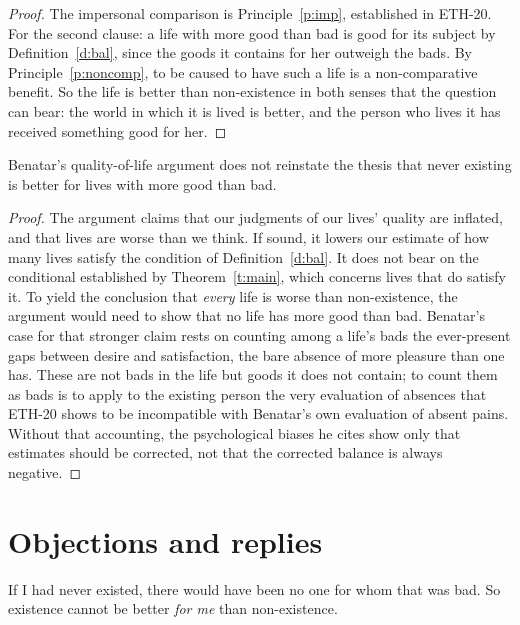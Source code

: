 \documentclass{situationist-preprint}
\begin{document}
\begin{proof}
The impersonal comparison is Principle~\ref{p:imp}, established in ETH-20. For the second clause: a life with more good than bad is good for its subject by Definition~\ref{d:bal}, since the goods it contains for her outweigh the bads. By Principle~\ref{p:noncomp}, to be caused to have such a life is a non-comparative benefit. So the life is better than non-existence in both senses that the question can bear: the world in which it is lived is better, and the person who lives it has received something good for her.
\end{proof}

\begin{proposition}\label{p:pollyanna}
Benatar's quality-of-life argument does not reinstate the thesis that never existing is better for lives with more good than bad.
\end{proposition}

\begin{proof}
The argument claims that our judgments of our lives' quality are inflated, and that lives are worse than we think. If sound, it lowers our estimate of how many lives satisfy the condition of Definition~\ref{d:bal}. It does not bear on the conditional established by Theorem~\ref{t:main}, which concerns lives that do satisfy it. To yield the conclusion that \emph{every} life is worse than non-existence, the argument would need to show that no life has more good than bad. Benatar's case for that stronger claim rests on counting among a life's bads the ever-present gaps between desire and satisfaction, the bare absence of more pleasure than one has. These are not bads in the life but goods it does not contain; to count them as bads is to apply to the existing person the very evaluation of absences that ETH-20 shows to be incompatible with Benatar's own evaluation of absent pains. Without that accounting, the psychological biases he cites show only that estimates should be corrected, not that the corrected balance is always negative.
\end{proof}

\section{Objections and replies}

\begin{objection}\label{o:noone}
If I had never existed, there would have been no one for whom that was bad. So existence cannot be better \emph{for me} than non-existence.
\end{objection}
\end{document}
